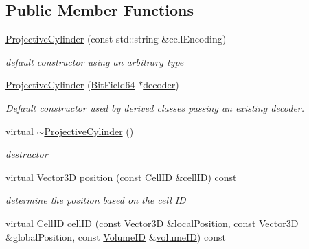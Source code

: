 \subsection*{Public Member Functions}
\begin{DoxyCompactItemize}
\item 
\hyperlink{class_d_d4hep_1_1_d_d_segmentation_1_1_projective_cylinder_ad99ec82db9b7ce8a7433bfa524c3040b}{Projective\+Cylinder} (const std\+::string \&cell\+Encoding)
\begin{DoxyCompactList}\small\item\em default constructor using an arbitrary type \end{DoxyCompactList}\item 
\hyperlink{class_d_d4hep_1_1_d_d_segmentation_1_1_projective_cylinder_afebb5add96b7e183f5e250e5e347f917}{Projective\+Cylinder} (\hyperlink{class_d_d4hep_1_1_d_d_segmentation_1_1_bit_field64}{Bit\+Field64} $\ast$\hyperlink{class_d_d4hep_1_1_d_d_segmentation_1_1_segmentation_abec3489982d0fe91ef4b142d9d755576}{decoder})
\begin{DoxyCompactList}\small\item\em Default constructor used by derived classes passing an existing decoder. \end{DoxyCompactList}\item 
virtual \hyperlink{class_d_d4hep_1_1_d_d_segmentation_1_1_projective_cylinder_a0177b7d45729494e87f22d74aa0f872a}{$\sim$\+Projective\+Cylinder} ()
\begin{DoxyCompactList}\small\item\em destructor \end{DoxyCompactList}\item 
virtual \hyperlink{struct_d_d4hep_1_1_d_d_segmentation_1_1_vector3_d}{Vector3D} \hyperlink{class_d_d4hep_1_1_d_d_segmentation_1_1_projective_cylinder_a0795705365655c869e455bab1efcfe3b}{position} (const \hyperlink{namespace_d_d4hep_1_1_d_d_segmentation_ac7af071d85cb48820914434a07e21ba1}{Cell\+ID} \&\hyperlink{class_d_d4hep_1_1_d_d_segmentation_1_1_projective_cylinder_ab90f41be410f8fbdc86278b2d11060ee}{cell\+ID}) const
\begin{DoxyCompactList}\small\item\em determine the position based on the cell ID \end{DoxyCompactList}\item 
virtual \hyperlink{namespace_d_d4hep_1_1_d_d_segmentation_ac7af071d85cb48820914434a07e21ba1}{Cell\+ID} \hyperlink{class_d_d4hep_1_1_d_d_segmentation_1_1_projective_cylinder_ab90f41be410f8fbdc86278b2d11060ee}{cell\+ID} (const \hyperlink{struct_d_d4hep_1_1_d_d_segmentation_1_1_vector3_d}{Vector3D} \&local\+Position, const \hyperlink{struct_d_d4hep_1_1_d_d_segmentation_1_1_vector3_d}{Vector3D} \&global\+Position, const \hyperlink{namespace_d_d4hep_1_1_d_d_segmentation_a61a6833a18d1800bdef176595f83e3ba}{Volume\+ID} \&\hyperlink{class_d_d4hep_1_1_d_d_segmentation_1_1_segmentation_a43c0e9648e3b7cded015847c0802f757}{volume\+ID}) const

\end{DoxyCompactItemize}
